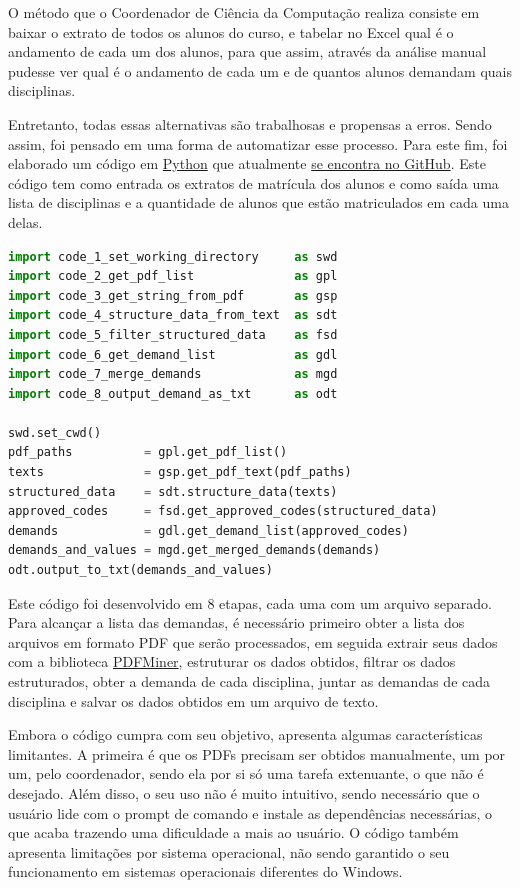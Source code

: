 O método que o Coordenador de Ciência da Computação realiza consiste em baixar o extrato de todos os alunos do curso, e tabelar no Excel qual é o andamento de cada um dos alunos, para que assim, através da análise manual pudesse ver qual é o andamento de cada um e de quantos alunos demandam quais disciplinas.

Entretanto, todas essas alternativas são trabalhosas e propensas a erros. Sendo assim, foi pensado em uma forma de automatizar esse processo. Para este fim, foi elaborado um código em \href{https://www.python.org/}{Python} que atualmente \href{https://github.com/jvfd3/university_demand}{se encontra no GitHub}. Este código tem como entrada os extratos de matrícula dos alunos e como saída uma lista de disciplinas e a quantidade de alunos que estão matriculados em cada uma delas.

\begin{lstlisting}[language=Python, caption={Obter demanda por extratos em PDF}]
import code_1_set_working_directory     as swd
import code_2_get_pdf_list              as gpl
import code_3_get_string_from_pdf       as gsp
import code_4_structure_data_from_text  as sdt
import code_5_filter_structured_data    as fsd
import code_6_get_demand_list           as gdl
import code_7_merge_demands             as mgd
import code_8_output_demand_as_txt      as odt

swd.set_cwd()
pdf_paths          = gpl.get_pdf_list()
texts              = gsp.get_pdf_text(pdf_paths)
structured_data    = sdt.structure_data(texts)
approved_codes     = fsd.get_approved_codes(structured_data)
demands            = gdl.get_demand_list(approved_codes)
demands_and_values = mgd.get_merged_demands(demands)
odt.output_to_txt(demands_and_values)
\end{lstlisting}

Este código foi desenvolvido em 8 etapas, cada uma com um arquivo separado. Para alcançar a lista das demandas, é necessário primeiro obter a lista dos arquivos em formato PDF que serão processados, em seguida extrair seus dados com a biblioteca \href{https://pypi.org/project/pdfminer/}{PDFMiner}, estruturar os dados obtidos, filtrar os dados estruturados, obter a demanda de cada disciplina, juntar as demandas de cada disciplina e salvar os dados obtidos em um arquivo de texto.

Embora o código cumpra com seu objetivo, apresenta algumas características limitantes. A primeira é que os PDFs precisam ser obtidos manualmente, um por um, pelo coordenador, sendo ela por si só uma tarefa extenuante, o que não é desejado. Além disso, o seu uso não é muito intuitivo, sendo necessário que o usuário lide com o prompt de comando e instale as dependências necessárias, o que acaba trazendo uma dificuldade a mais ao usuário. O código também apresenta limitações por sistema operacional, não sendo garantido o seu funcionamento em sistemas operacionais diferentes do Windows.


